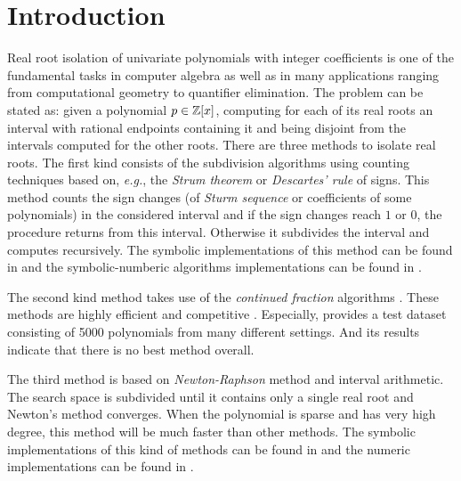 
\section{Introduction }
\label{}
Real root isolation of univariate polynomials with integer coefficients is one of the fundamental tasks in computer algebra as well as in many applications ranging from computational geometry to quantifier elimination. The problem can be stated as: given a polynomial $p\in {\mathbb Z}[x]$, computing for each of its real roots an interval with rational endpoints containing it and being disjoint from the intervals
computed for the other roots.  There are three methods to isolate real roots.  The first kind consists of the subdivision algorithms using counting techniques based  on, {\it e.g.}, the {\em Strum theorem} or
{\em Descartes' rule} of signs.  This  method counts the sign changes (of {\em Sturm sequence} or coefficients of some polynomials) in the considered interval and if the sign changes reach $1$ or $0$, the procedure returns from this interval.
Otherwise it subdivides the interval and computes recursively. The symbolic implementations of this method can be found in \cite{collin76,rou04,kobel2016computing,Tsigaridas2016} and the symbolic-numberic algorithms implementations can be found in \cite{rou04,eig05,eig08,meh11}.

The second kind method takes use of the {\em continued fraction} algorithms \cite{akr08,tsi08,sha08}. These methods are highly efficient and competitive \cite{rou04,hemmer09}. Especially,  \cite{hemmer09} provides a test dataset   consisting of 5000 polynomials from many
different settings. And its   results indicate that there is no best method overall.

The third method is based on {\em Newton-Raphson} method and interval arithmetic.
The search space is subdivided until it contains only a single real root and Newton's method converges. When the polynomial is sparse and has very high degree, this method will be much faster than other methods. The symbolic implementations of this kind of methods can be found in \cite{xia06,xia07} and the numeric implementations
can be found in \cite{kla93,rump99}.

